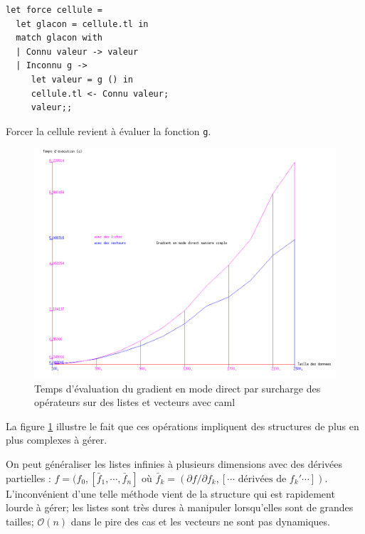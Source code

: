 {\small
\begin{verbatim}
let force cellule =
  let glacon = cellule.tl in
  match glacon with
  | Connu valeur -> valeur
  | Inconnu g ->
     let valeur = g () in
     cellule.tl <- Connu valeur;
     valeur;;
\end{verbatim}
}
\noindent
Forcer la cellule revient \`a \'evaluer la fonction \verb!g!.
\begin{figure}
\caption{Temps d'\'evaluation du gradient en mode direct par surcharge des op\'erateurs sur 
des listes et vecteurs avec caml}
\begin{center}
\includegraphics[scale=0.6]{figures/caml1.png}
\end{center}
\label{fig:caml1}
\end{figure}
La figure \ref{fig:caml1} illustre le fait que ces op\'erations impliquent des structures de plus en plus complexes \`a g\'erer.




On peut g\'en\'eraliser les listes infinies \`a plusieurs dimensions avec des d\'eriv\'ees partielles :
$f=(f_0,[\bar f_1,\cdots, \bar f_n] $ o\`u $\bar f_k=(\partial f/\partial f_k,[\cdots \text{ d\'eriv\'ees de }f_k' \cdots])$.
L'inconv\'enient d'une telle m\'ethode vient de la structure qui est rapidement lourde \`a g\'erer; les listes sont tr\`es dures
\`a manipuler lorsqu'elles sont de grandes tailles; $\mathcal{O}(n)$ dans le pire des cas et les vecteurs ne sont pas dynamiques.\\






